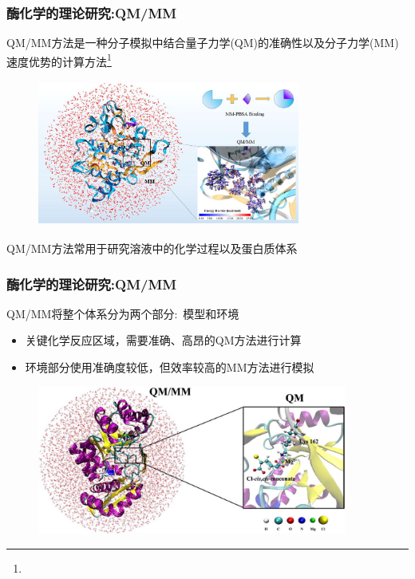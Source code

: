 \frame
{
	\frametitle{酶化学的理论研究:\textrm{QM/MM}}
	\textrm{QM/MM}方法是一种分子模拟中结合量子力学\textrm{(QM)}的准确性以及分子力学\textrm{(MM)}速度优势的计算方法\footnote{\fontsize{6.0pt}{4.2pt}}
\begin{figure}[h!]
\centering
\vspace{-10.5pt}
\includegraphics[height=1.90in,width=3.40in,viewport=0 0 240 140,clip]{Figures/QM-MM_part.jpg}
\label{QM-MM_depart}
\end{figure}
\textrm{QM/MM}方法常用于研究溶液中的化学过程以及蛋白质体系
}

\frame
{
	\frametitle{酶化学的理论研究:\textrm{QM/MM}}
	\textrm{QM/MM}将整个体系分为两个部分:~模型和环境
	\begin{itemize}
		\item 关键化学反应区域，需要准确、高昂的\textrm{QM}方法进行计算
		\item 环境部分使用准确度较低，但效率较高的\textrm{MM}方法进行模拟
	\end{itemize}
\begin{figure}[h!]
\centering
\vspace{-10.5pt}
\includegraphics[height=1.92in,width=4.0in,viewport=0 0 280 130,clip]{Figures/QM_MM-2.jpg}
\label{QM-MM-surface}
\end{figure}
}

